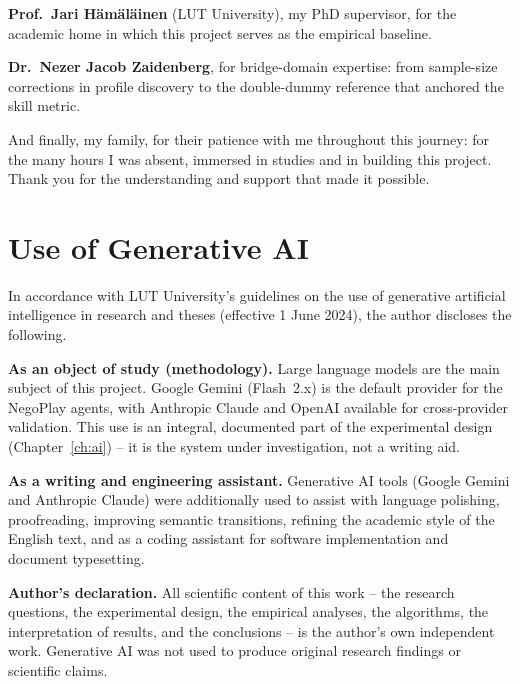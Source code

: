\documentclass[11pt, a4paper, oneside, openany]{report}
\begin{document}
\vspace{0.3cm}
\textbf{Prof.\ Jari H\"am\"al\"ainen} (LUT University), my PhD supervisor,
for the academic home in which this project serves as the empirical baseline.

\vspace{0.3cm}
\textbf{Dr.\ Nezer Jacob Zaidenberg}, for bridge-domain expertise: from
sample-size corrections in profile discovery to the double-dummy reference
that anchored the skill metric.

\vspace{0.3cm}
And finally, my family, for their patience with me throughout this journey:
for the many hours I was absent, immersed in studies and in building this
project. Thank you for the understanding and support that made it possible.

\clearpage
\chapter*{Use of Generative AI}

In accordance with LUT University's guidelines on the use of generative
artificial intelligence in research and theses (effective 1 June 2024), the
author discloses the following.

\vspace{0.3cm}
\textbf{As an object of study (methodology).} Large language models are the
main subject of this project. Google Gemini (Flash~2.x) is the default
provider for the NegoPlay agents, with Anthropic Claude and OpenAI available
for cross-provider validation. This use is an integral, documented part of the
experimental design (Chapter~\ref{ch:ai}) -- it is the system under
investigation, not a writing aid.

\vspace{0.3cm}
\textbf{As a writing and engineering assistant.} Generative AI tools
(Google Gemini and Anthropic Claude) were additionally used to assist with
language polishing, proofreading, improving semantic transitions, refining the
academic style of the English text, and as a coding assistant for software
implementation and document typesetting.

\vspace{0.3cm}
\textbf{Author's declaration.} All scientific content of this work --
the research questions, the experimental design, the empirical analyses, the
algorithms, the interpretation of results, and the conclusions -- is the
author's own independent work. Generative AI was not used to produce original
research findings or scientific claims.
\end{document}
